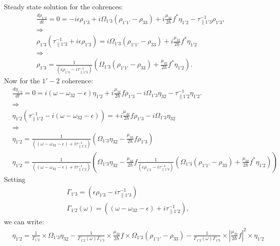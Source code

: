 \documentclass[10pt,letterpaper]{article}
\begin{document}
	
	Steady state solution for the cohrences:
	\begin{align}
	&\frac{d \rho_{1'3}}{d t}  = 0 =  -i\epsilon\rho_{1'3} +i \Omega_{1'3}(\rho_{1'1'} - \rho_{33}) +i\frac{\mu_{32}}{2 \hbar}f^*\eta_{1'2}-\tau_{\parallel 1'3}^{-1} \rho_{1'3},  \\
	&\Rightarrow \nonumber \\
	&\rho_{1'3} (\tau_{\parallel 1'3}^{-1}+i\epsilon\rho_{1'3}) = i \Omega_{1'3}(\rho_{1'1'} - \rho_{33}) +i\frac{\mu_{32}}{2 \hbar}f^*\eta_{1'2} \\
	&\Rightarrow \nonumber \\
	&\rho_{1'3}  =\frac{1}{(\epsilon\rho_{1'3}-i\tau_{\parallel 1'3}^{-1})} \left( \Omega_{1'3}(\rho_{1'1'} - \rho_{33}) +\frac{\mu_{32}}{2 \hbar}f^*\eta_{1'2} \right).
	\end{align}
	Now for the $1'-2$ coherence:
	\begin{align}
	&\frac{d \eta_{1'2}}{d t}  = 0 = i(\omega - \omega_{32}-\epsilon)\eta_{1'2} +i \frac{\mu_{32}}{2\hbar}f\rho_{1'3} - i\Omega_{1'3}\eta_{32} - \tau_{\parallel 1'2}^{-1}\eta_{1'2}. \\
	&\Rightarrow \nonumber \\
	&\eta_{1'2}(\tau_{\parallel 1'2}^{-1} -i(\omega - \omega_{32}-\epsilon)) =  +i \frac{\mu_{32}}{2\hbar}f\rho_{1'3} - i\Omega_{1'3}\eta_{32}  \\
	&\Rightarrow \nonumber \\
	&\eta_{1'2}=  \frac{1}{((\omega - \omega_{32}-\epsilon)+i\tau_{\parallel 1'2}^{-1} ) } \left(\Omega_{1'3}\eta_{32} - \frac{\mu_{32}}{2\hbar}f\rho_{1'3} \right)  \\
	&\eta_{1'2}=  \frac{1}{((\omega - \omega_{32}-\epsilon)+i\tau_{\parallel 1'2}^{-1} ) } \left(\Omega_{1'3}\eta_{32} - \frac{\mu_{32}}{2\hbar}f\frac{1}{(\epsilon\rho_{1'3}-i\tau_{\parallel 1'3}^{-1})} \left( \Omega_{1'3}(\rho_{1'1'} - \rho_{33}) +\frac{\mu_{32}}{2 \hbar}f^*\eta_{1'2} \right) \right)
	\end{align}
	Setting
	\begin{align}
	\Gamma_{1'3} = (\epsilon\rho_{1'3}-i\tau_{\parallel 1'3}^{-1}) \\
	\Gamma_{1'2}(\omega) = ((\omega - \omega_{32}-\epsilon)+i\tau_{\parallel 1'2}^{-1} ),
	\end{align}
	we can write:
	\begin{align}
	&\eta_{1'2}=  \frac{1}{ \Gamma_{1'2} } \times \Omega_{1'3}\eta_{32} - \frac{1}{\Gamma_{1'2}(\omega)\Gamma_{1'3}}\times \frac{\mu_{32}}{2 \hbar}f\times \Omega_{1'3}(\rho_{1'1'} - \rho_{33})- \frac{1}{\Gamma_{1'2}(\omega)\Gamma_{1'3}}\times|\frac{\mu_{32}}{2 \hbar}f|^2\times\eta_{1'2}
	\end{align}
\end{document}
